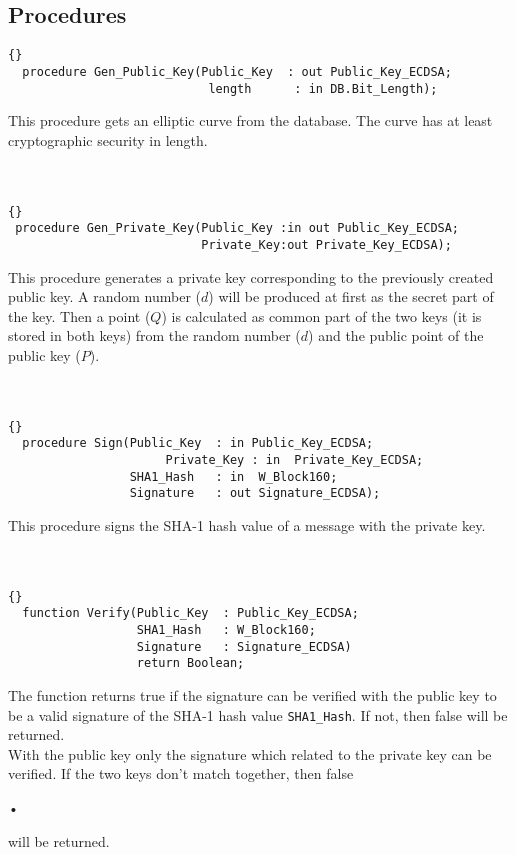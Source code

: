 \subsection*{Procedures}
\begin{lstlisting}{}
  procedure Gen_Public_Key(Public_Key  : out Public_Key_ECDSA;
			               	length      : in DB.Bit_Length);
\end{lstlisting}
This procedure gets an elliptic curve from the database. The curve has at least cryptographic security in length.\\
\hline \\ \ \\
\begin{lstlisting}{}
 procedure Gen_Private_Key(Public_Key :in out Public_Key_ECDSA;
                           Private_Key:out Private_Key_ECDSA);
\end{lstlisting}
This procedure generates a private key corresponding to the previously created public key. A random number ($d$) will be produced at first as the secret part of the key. Then a point ($Q$) is calculated as common part of the two keys (it is stored in both keys) from the random number ($d$) and the public point of the public key ($P$).\\
\hline \\ \ \\
\begin{lstlisting}{}
  procedure Sign(Public_Key  : in Public_Key_ECDSA;
		 			  Private_Key : in  Private_Key_ECDSA;
                 SHA1_Hash   : in  W_Block160;
                 Signature   : out Signature_ECDSA);
\end{lstlisting}
This procedure signs the SHA-1 hash value of a message with the private key.\\
\hline \\ \ \\
\begin{lstlisting}{}
  function Verify(Public_Key  : Public_Key_ECDSA;
                  SHA1_Hash   : W_Block160;
                  Signature   : Signature_ECDSA)
                  return Boolean;
\end{lstlisting}
The function returns true if the signature can be verified with the public key to be a valid signature of the SHA-1 hash value \texttt{SHA1\_Hash}. If not, then false will be returned.\\
With the public key only the signature which related to the private key can be verified. If the two keys don't match together, then false\begin{scriptsize}
•
\end{scriptsize} will be returned.\\
